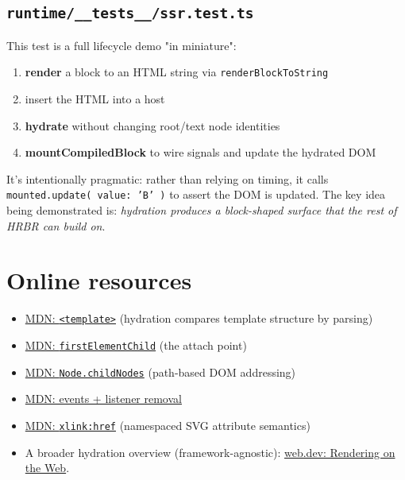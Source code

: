 \subsection{\texttt{runtime/\_\_tests\_\_/ssr.test.ts}}

This test is a full lifecycle demo "in miniature":

\begin{enumerate}
  \item \textbf{render} a block to an HTML string via \texttt{renderBlockToString}
  \item insert the HTML into a host
  \item \textbf{hydrate} without changing root/text node identities
  \item \textbf{mountCompiledBlock} to wire signals and update the hydrated DOM
\end{enumerate}

It’s intentionally pragmatic: rather than relying on timing, it calls \texttt{mounted.update({ value: 'B' })} to assert the DOM is updated.
The key idea being demonstrated is: \emph{hydration produces a block-shaped surface that the rest of HRBR can build on}.

\section{Online resources}

\begin{itemize}
  \item \href{https://developer.mozilla.org/en-US/docs/Web/HTML/Element/template}{MDN: \texttt{<template>}} (hydration compares template structure by parsing)
  \item \href{https://developer.mozilla.org/en-US/docs/Web/API/Element/firstElementChild}{MDN: \texttt{firstElementChild}} (the attach point)
  \item \href{https://developer.mozilla.org/en-US/docs/Web/API/Node/childNodes}{MDN: \texttt{Node.childNodes}} (path-based DOM addressing)
  \item \href{https://developer.mozilla.org/en-US/docs/Web/API/EventTarget/addEventListener}{MDN: events + listener removal}
  \item \href{https://developer.mozilla.org/en-US/docs/Web/SVG/Attribute/xlink:href}{MDN: \texttt{xlink:href}} (namespaced SVG attribute semantics)
  \item A broader hydration overview (framework-agnostic):
  \href{https://web.dev/rendering-on-the-web/}{web.dev: Rendering on the Web}.
\end{itemize}

